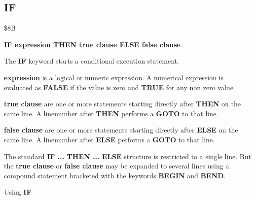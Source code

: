 
\newpage
\subsection{IF}
\begin{description}[leftmargin=3cm,style=nextline]
\item [Token:] \$8B
\item [Format:] {\bf IF expression THEN true clause ELSE false clause}
\item [Usage:] The {\bf IF} keyword starts a conditional execution
               statement.

               {\bf expression} is a logical or numeric expression.
               A numerical expression is evaluated as {\bf FALSE}
               if the value is zero and {\bf TRUE} for any non zero
               value.

               {\bf true clause} are one or more statements starting
               directly after {\bf THEN} on the same line.
               A linenumber after {\bf THEN} performs a
               {\bf GOTO} to that line.

               {\bf false clause} are one or more statements starting
               directly after {\bf ELSE} on the same line.
               A linenumber after {\bf ELSE} performs a
               {\bf GOTO} to that line.

\item [Remarks:]
               The standard {\bf IF ... THEN ... ELSE} structure
               is restricted to a single line. But the {\bf true clause}
               or {\bf false clause} may be expanded to several lines
               using a compound statement bracketed with the keywords
               {\bf BEGIN} and {\bf BEND}.
\item [Example:]
                Using {\bf IF}
\end{description}


\newpage
